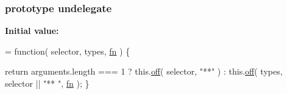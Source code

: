 \subsubsection[{undelegate}]{ {\bf prototype} undelegate}\label{jquery-1_810_82-vsdoc_8js_adf3212944c5742602d54b599a05f0746}
{\bfseries Initial value\+:}
\begin{DoxyCode}
= \textcolor{keyword}{function}( selector, types, \hyperlink{jquery-1_810_82-vsdoc_8js_acef6bdaf6b9b20fdcca1ea86f0902c3b}{fn} ) \{


        
        \textcolor{keywordflow}{return} arguments.length === 1 ? this.\hyperlink{jquery-1_810_82-vsdoc_8js_abd3345ae76b0b1425e11cd916e7bc97c}{off}( selector, \textcolor{stringliteral}{"**"} ) : this.\hyperlink{jquery-1_810_82-vsdoc_8js_abd3345ae76b0b1425e11cd916e7bc97c}{off}( types, selector || \textcolor{stringliteral}{"**
      "}, \hyperlink{jquery-1_810_82-vsdoc_8js_acef6bdaf6b9b20fdcca1ea86f0902c3b}{fn} );
    \}
\end{DoxyCode}
\hypertarget{jquery-1_810_82-vsdoc_8js_a55d5adf9da69a81b8295f6bedfc34f60}{}

